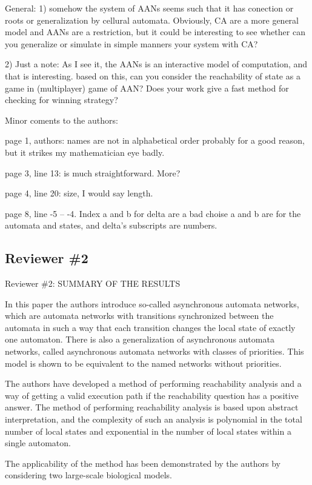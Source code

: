 \documentclass[11pt]{article}
\begin{document}
General: 1) somehow the system of AANs seems such that it has conection or roots or generalization by cellural automata. Obviously, CA are a more general model and AANs are a restriction, but it could be interesting to see whether can you generalize or simulate in simple manners your system with CA?

2) Just a note: As I see it, the AANs is an interactive model of computation, and that is interesting. based on this, can you consider the reachability of state as a game in (multiplayer) game of AAN? Does  your work give a fast method for checking for winning strategy?   
 
Minor coments to the authors: 

page 1, authors: names are not in alphabetical order probably for a good reason, but it strikes my mathematician eye badly.

page 3, line 13: is much straightforward. More?

page 4, line 20: size, I would say length.

page 8, line -5 -- -4. Index a and b for delta are a bad choise a and b are for the automata and states, and delta's subscripts are numbers.



\subsection*{Reviewer \#2}



Reviewer \#2: SUMMARY OF THE RESULTS

In this paper the authors introduce so-called asynchronous automata networks, which are automata networks with transitions synchronized between the automata in such a way that each transition changes the local state of exactly one automaton. There is also a generalization of asynchronous automata networks, called asynchronous automata networks with classes of priorities. This model is shown to be equivalent to the named networks without priorities.

The authors have developed a method of performing reachability analysis and a way of getting a valid execution path if the reachability question has a positive answer. The method of performing reachability analysis is based upon abstract interpretation, and the complexity of such an analysis is polynomial in the total number of local states and exponential in the number of local states within a single automaton.

The applicability of the method has been demonstrated by the authors by considering two large-scale biological models.
\end{document}
